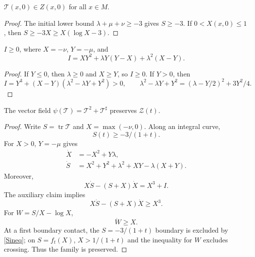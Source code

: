 \begin{claim}
\label{claim:pinching-initial-condition}

${\mathcal T}(x,0)\in Z(x,0)$ for all $x\in M$.
\end{claim}
\begin{proof}
\sketch The initial lower bound $\lambda+\mu+\nu\ge-3$ gives
$S\ge-3$. If $0<X(x,0)\le1$, then $S\ge-3X\ge X(\log X-3)$.
\end{proof}

\begin{claim}
\label{claim:pinching-auxiliary-quantity-nonnegative}
$I\ge0$, where $X=-\nu$, $Y=-\mu$, and
\[
I=XY^2+\lambda Y(Y-X)+\lambda^2(X-Y).
\]
\end{claim}
\begin{proof}
\sketch If $Y\le0$, then $\lambda\ge0$ and $X\ge Y$, so $I\ge0$. If
$Y>0$, then
\[
I=Y^3+(X-Y)(\lambda^2-\lambda Y+Y^2)>0,
\qquad \lambda^2-\lambda Y+Y^2=(\lambda-Y/2)^2+3Y^2/4.
\]
\end{proof}

\begin{claim}
\label{claim:pinching-vector-field-preserves-family}

The vector field $\psi({\mathcal T})={\mathcal T}^2+{\mathcal T}^{\sharp}$
preserves ${\mathcal Z}(t)$.
\end{claim}
\begin{proof}
\sketch Write $S=\operatorname{tr}{\mathcal T}$ and $X=\max(-\nu,0)$.
Along an integral curve,
\begin{equation}\label{Sineq}S(t)\ge-3/(1+t).\end{equation}
For $X>0$, $Y=-\mu$ gives
\begin{align*}
\dot X&=-X^2+Y\lambda,\\
\dot S&=X^2+Y^2+\lambda^2+XY-\lambda(X+Y).
\end{align*}
Moreover,
\begin{equation}\label{dX}X\dot S-(S+X)\dot X=X^3+I.
\end{equation}
The auxiliary claim implies
\begin{equation}\label{dX1}X\dot S-(S+X)\dot X\ge X^3.\end{equation}
For $W=S/X-\log X$,
\begin{equation}\label{dW}\dot W\ge X.
\end{equation}
At a first boundary contact, the $S=-3/(1+t)$ boundary is excluded by
\eqref{Sineq}; on $S=f_t(X)$, $X>1/(1+t)$ and the inequality for $W$
excludes crossing. Thus the family is preserved.
\end{proof}

